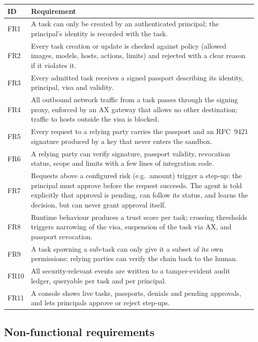 \begin{center}
\small
\begin{tabularx}{\linewidth}{@{}lY@{}}
\toprule
\textbf{ID} & \textbf{Requirement}\\
\midrule
FR1 & A task can only be created by an authenticated principal; the principal's identity is recorded with the task.\\
FR2 & Every task creation or update is checked against policy (allowed images, models, hosts, actions, limits) and rejected with a clear reason if it violates it.\\
FR3 & Every admitted task receives a signed passport describing its identity, principal, visa and validity.\\
FR4 & All outbound network traffic from a task passes through the signing proxy, enforced by an AX gateway that allows no other destination; traffic to hosts outside the visa is blocked.\\
FR5 & Every request to a relying party carries the passport and an RFC~9421 signature produced by a key that never enters the sandbox.\\
FR6 & A relying party can verify signature, passport validity, revocation status, scope and limits with a few lines of integration code.\\
FR7 & Requests above a configured risk (e.g.\ amount) trigger a step-up: the principal must approve before the request succeeds. The agent is told explicitly that approval is pending, can follow its status, and learns the decision, but can never grant approval itself.\\
FR8 & Runtime behaviour produces a trust score per task; crossing thresholds triggers narrowing of the visa, suspension of the task via AX, and passport revocation.\\
FR9 & A task spawning a sub-task can only give it a subset of its own permissions; relying parties can verify the chain back to the human.\\
FR10 & All security-relevant events are written to a tamper-evident audit ledger, queryable per task and per principal.\\
FR11 & A console shows live tasks, passports, denials and pending approvals, and lets principals approve or reject step-ups.\\
\bottomrule
\end{tabularx}
\end{center}

\subsection{Non-functional requirements}

